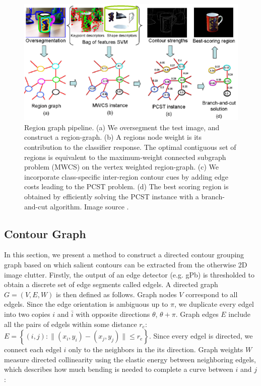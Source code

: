 \documentclass{SMBV12}
\begin{document}
\begin{figure}[htbp]
    \centering
    \includegraphics[width=\textwidth]{images/region_graph1.png}
    \caption{Region graph pipeline. (a) We oversegment the test image, and construct a region-graph. (b) A region\textquotesingle s node weight is its contribution to the classifier response. The optimal contiguous set of regions is equivalent to the maximum-weight connected subgraph problem (MWCS) on the vertex weighted region-graph. (c) We incorporate class-specific inter-region contour cues by adding edge costs leading to the PCST problem. (d) The best scoring region is obtained by efficiently solving the PCST instance with a branch-and-cut algorithm. Image source \cite{VijayGrauman2011}.}
    \label{fig:region_graph}
\end{figure}

\subsection{Contour Graph}

In this section, we present a method to construct a directed contour grouping graph \cite{zhu2007untangling} based on which salient contours can be extracted from the otherwise 2D image clutter. Firstly, the output of an edge detector (e.g. gPb) is thresholded to obtain a discrete set of edge segments called edgels. A directed graph $G = (V,E,W)$ is then defined as follows. Graph nodes $V$ correspond to all edgels. Since the edge orientation is ambiguous up to $\pi$, we duplicate every edgel into two copies $i$ and $\bar{i}$ with opposite directions $\theta$, $\theta + \pi$. Graph edges $E$ include all the pairs of edgels within some distance $r_e$: $E = \left\lbrace (i, j): \| (x_i, y_i) - (x_j, y_j) \| \leq r_e \right\rbrace$. Since every edgel is directed, we connect each edgel $i$ only to the neighbors in the its direction. Graph weights $W$ measure directed collinearity using the elastic energy between neighboring edgels, which describes how much bending is needed to complete a curve between $i$ and $j$:
\end{document}
